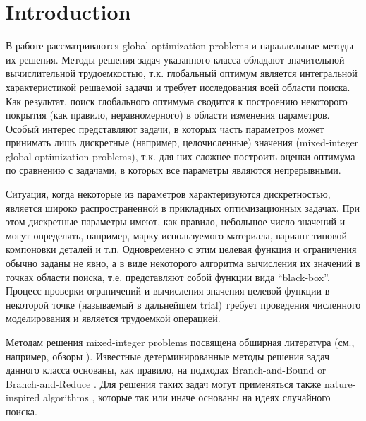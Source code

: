 \documentclass[
11pt,%
tightenlines,%
twoside,%
onecolumn,%
nofloats,%
nobibnotes,%
nofootinbib,%
superscriptaddress,%
noshowpacs,%
centertags]%
{revtex4}
\begin{document}

\maketitle


\section{Introduction}

В работе рассматриваются global optimization problems и параллельные методы их решения. Методы решения задач указанного класса  обладают значительной вычислительной трудоемкостью, т.к. глобальный оптимум является интегральной характеристикой решаемой задачи и требует исследования всей области поиска. Как результат, поиск глобального оптимума сводится к построению некоторого покрытия (как правило, неравномерного) в области изменения параметров. Особый интерес представляют задачи, в которых часть параметров может принимать лишь дискретные (например, целочисленные) значения (mixed-integer global optimization problems), т.к. для них сложнее построить оценки оптимума по сравнению с задачами, в которых все параметры являются непрерывными.

Ситуация, когда некоторые из параметров характеризуются дискретностью, является широко распространенной в прикладных оптимизационных задачах. При этом дискретные параметры имеют, как правило, небольшое число значений и могут определять, например, марку используемого материала, вариант типовой компоновки деталей и т.п. 
Одновременно с этим целевая функция и ограничения обычно заданы не явно, а в виде некоторого алгоритма вычисления их значений в точках области поиска, т.е. представляют собой функции вида “black-box”. Процесс проверки ограничений и вычисления значения целевой функции в некоторой точке (называемый в дальнейшем trial) требует проведения численного моделирования и является трудоемкой операцией. 

Методам решения mixed-integer problems посвящена обширная литература (см., например, обзоры \cite{Burer,Boukouvala}). Известные детерминированные методы решения задач данного класса основаны, как правило, на подходах Branch-and-Bound \cite{Belotti} or Branch-and-Reduce \cite{Vigerske}. Для решения таких задач могут применяться также nature-inspired algorithms \cite{Deep,Schluter}, которые так или иначе основаны на идеях случайного поиска.
\end{document}
